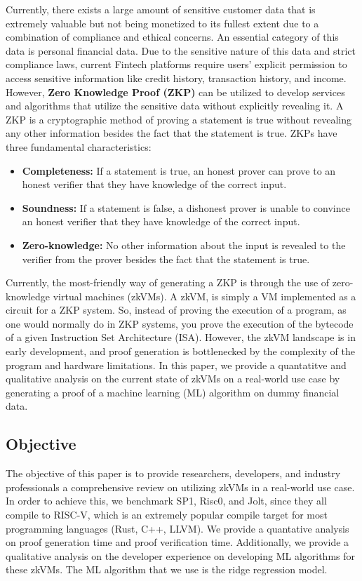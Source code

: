 \documentclass{scrartcl}
\begin{document}
Currently, there exists a large amount of sensitive customer data that is extremely valuable but not being monetized to its fullest extent due to a combination of compliance and ethical concerns. An essential category of this data is personal financial data. Due to the sensitive nature of this data and strict compliance laws, current Fintech platforms require users’ explicit permission to access sensitive information like credit history, transaction history, and income. However, \textbf{Zero Knowledge Proof (ZKP)} can be utilized to develop services and algorithms that utilize the sensitive data without explicitly revealing it. A ZKP is a cryptographic method of proving a statement is true without revealing any other information besides the fact that the statement is true. ZKPs have three fundamental characteristics:

\begin{itemize}
    \item \textbf{Completeness:} If a statement is true, an honest prover can prove to an honest verifier that they have knowledge of the correct input.
    \item \textbf{Soundness:} If a statement is false, a dishonest prover is unable to convince an honest verifier that they have knowledge of the correct input.
    \item \textbf{Zero-knowledge:} No other information about the input is revealed to the verifier from the prover besides the fact that the statement is true.
\end{itemize}

Currently, the most-friendly way of generating a ZKP is through the use of zero-knowledge virtual machines (zkVMs). A zkVM, is simply a VM implemented as a circuit for a ZKP system. So, instead of proving the execution of a program, as one would normally do in ZKP systems, you prove the execution of the bytecode of a given Instruction Set Architecture (ISA). However, the zkVM landscape is in early development, and proof generation is bottlenecked by the complexity of the program and hardware limitations. In this paper, we provide a quantatitve and qualitative analysis on the current state of zkVMs on a real-world use case by generating a proof of a machine learning (ML) algorithm on dummy financial data.

\subsection{Objective}

The objective of this paper is to provide researchers, developers, and industry professionals a comprehensive review on utilizing zkVMs in a real-world use case. In order to achieve this, we benchmark SP1\cite{Roy2024}, Risc0\cite{bruestle2023risc}, and Jolt\cite{arun2024jolt}, since they all compile to RISC-V, which is an extremely popular compile target for most programming languages (Rust, C++, LLVM). We provide a quantative analysis on proof generation time and proof verification time. Additionally, we provide a qualitative analysis on the developer experience on developing ML algorithms for these zkVMs. The ML algorithm that we use is the ridge regression model. 
\end{document}
